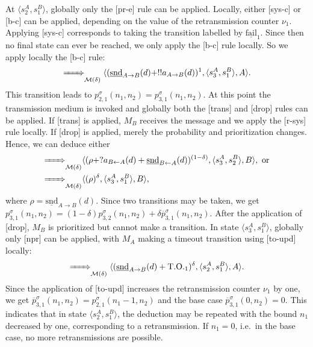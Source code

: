 \documentclass{sig-alternate}
\renewcommand{\d}{\delta}
\newcommand{\timeout}{\mathrm{T.O.}}
\newcommand{\locev}[1]{\underline{#1}}
\newcommand{\fail}{\locev{\mathrm{fail}}}
\newcommand{\snd}{\mathrm{snd}}
\newcommand{\env}[4]{\locev{#1}_{{#2} \rightarrow {#3}}(#4)}
\newcommand{\sys}[4]{\locev{#1}_{{#2} \leftarrow {#3}}(#4)}
\begin{document}
At $\langle s^A_2, s^B_1 \rangle$, globally only the [pr-e] rule can be applied. Locally, either [sys-c] or [b-c] can be applied, depending on the value of the retransmission counter $\nu_1$. Applying [sys-c] corresponds to taking the transition labelled by $\fail_1$. Since then no final state can ever be reached, we only apply the [b-c] rule locally. So we apply locally the [b-c] rule:
\begin{equation*}
	\bigstep{} \langle (\env{\snd}{A}{B}{d} + !!a_{A \rightarrow B}(d))^1, \langle s^A_3, s^B_1 \rangle, A \rangle.
\end{equation*}
This transition leads to $p^{\sigma}_{2, 1}(n_1, n_2) = p^{\sigma}_{3, 1}(n_1, n_2)$. At this point the transmission medium is invoked and globally both the [trans] and [drop] rules can be applied. If [trans] is applied, $M_B$ receives the message and we apply the [r-sys] rule locally. If [drop] is applied, merely the probability and prioritization changes. Hence, we can deduce either
\begin{align*}
\bigstep{} &\langle (\rho + ?a_{B \leftarrow A}(d) + \sys{\snd}{B}{A}{d})^{(1 - \d)}, \langle s^A_3, s^B_2 \rangle, B \rangle,~\text{or}\\
\bigstep{} &\langle (\rho)^{\d}, \langle s^A_3, s^B_1 \rangle, B \rangle,
\end{align*}
where $\rho = \env{\snd}{A}{B}{d}$. Since two transitions may be taken, we get $p^{\sigma}_{3, 1}(n_1, n_2) = (1-\d)p^{\sigma}_{3, 2}(n_1, n_2) + \d\overline{p}^{\sigma}_{3, 1}(n_1, n_2)$. After the application of [drop], $M_B$ is prioritized but cannot make a transition. In state $\langle s^A_3, s^B_1 \rangle$, globally only [npr] can be applied, with $M_A$ making a timeout transition using [to-upd] locally:
\begin{equation*}
	\bigstep{} \langle (\env{\snd}{A}{B}{d} + \timeout_1)^{\d}, \langle s^A_2, s^B_1 \rangle, A \rangle.
\end{equation*}
Since the application of [to-upd] increases the retransmission counter $\nu_1$ by one, we get $\overline{p}^{\sigma}_{3, 1}(n_1, n_2) = p^{\sigma}_{2, 1}(n_1 - 1, n_2)$ and the base case $\overline{p}^{\sigma}_{3, 1}(0, n_2) = 0$. This indicates that in state $\langle s^A_2, s^B_1 \rangle$, the deduction may be repeated with the bound $n_1$ decreased by one, corresponding to a retransmission. If $n_1 = 0$, i.e.\ in the base case, no more retransmissions are possible.
\end{document}
